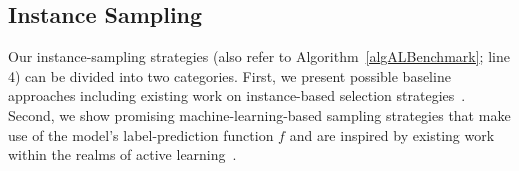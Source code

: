 \documentclass[runningheads]{llncs}
\begin{document}


\subsection{Instance Sampling}
\label{sec:main2}
Our instance-sampling strategies (also refer to Algorithm~\ref{algALBenchmark}; line 4) can be divided into two categories.
First, we present possible baseline approaches including existing work on instance-based selection strategies~\cite{Bossek021a,GentHJKMNN14,MatriconAFSH21}.
Second, we show promising machine-learning-based sampling strategies that make use of the model's label-prediction function $f$ and are inspired by existing work within the realms of active learning~\cite{settles2009active}.
\end{document}
